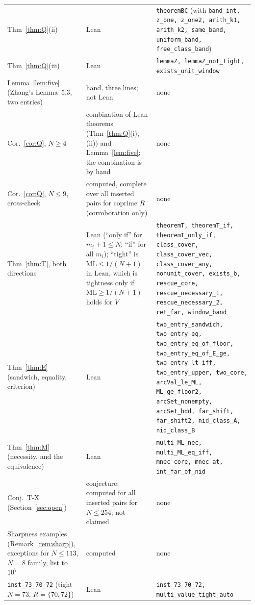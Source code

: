 \documentclass[11pt]{article}
\theoremstyle{definition}
\theoremstyle{remark}
\newcommand{\ML}{\mathrm{ML}}
\begin{document}
{\begin{longtable}{@{}p{}p{}p{}@{}}
Thm~\ref{thm:Q}(ii) & Lean & \texttt{theoremBC} (with \texttt{band\_int, z\_one, z\_one2, arith\_k1, arith\_k2, same\_band, uniform\_band, free\_class\_band}) \\
Thm~\ref{thm:Q}(iii) & Lean & \texttt{lemmaZ, lemmaZ\_not\_tight, exists\_unit\_window} \\
Lemma~\ref{lem:five} (Zhang's Lemma~5.3, two entries) & hand, three lines; not Lean & none \\
Cor.~\ref{cor:Q}, $N\ge4$ & combination of Lean theorems (Thm~\ref{thm:Q}(i),(ii)) and Lemma~\ref{lem:five}; the combination is by hand & none \\
Cor.~\ref{cor:Q}, $N\le9$, cross-check & computed, complete over all inserted pairs for coprime $R$ (corroboration only) & none \\
Thm~\ref{thm:T}, both directions & Lean (``only if'' for $m_i+1\le N$; ``if'' for all $m_i$); ``tight'' is $\ML\le1/(N+1)$ in Lean, which is tightness only if $\ML\ge1/(N+1)$ holds for $V$ & \texttt{theoremT, theoremT\_if, theoremT\_only\_if, class\_cover, class\_cover\_vec, class\_cover\_any, nonunit\_cover, exists\_b, rescue\_core, rescue\_necessary\_1, rescue\_necessary\_2, ret\_far, window\_band} \\
Thm~\ref{thm:E} (sandwich, equality, criterion) & Lean & \texttt{two\_entry\_sandwich, two\_entry\_eq, two\_entry\_eq\_of\_floor, two\_entry\_eq\_of\_E\_ge, two\_entry\_lt\_iff, two\_entry\_upper, two\_core, arcVal\_le\_ML, ML\_ge\_floor2, arcSet\_nonempty, arcSet\_bdd, far\_shift, far\_shift2, nid\_class\_A, nid\_class\_B} \\
Thm~\ref{thm:M} (necessity, and the equivalence) & Lean & \texttt{multi\_ML\_nec, multi\_ML\_eq\_iff, mnec\_core, mnec\_at, int\_far\_of\_nid} \\
Conj.\ T-X (Section~\ref{sec:open}) & conjecture; computed for all inserted pairs for $N\le254$; not claimed & none \\
Sharpness examples (Remark~\ref{rem:sharp}), exceptions for $N\le113$, $N=8$ family, list to $10^7$ & computed & none \\
\texttt{inst\_73\_70\_72} (tight $N=73$, $R=\{70,72\}$) & Lean & \texttt{inst\_73\_70\_72, multi\_value\_tight\_auto} \\
\end{longtable}
}
\end{document}
